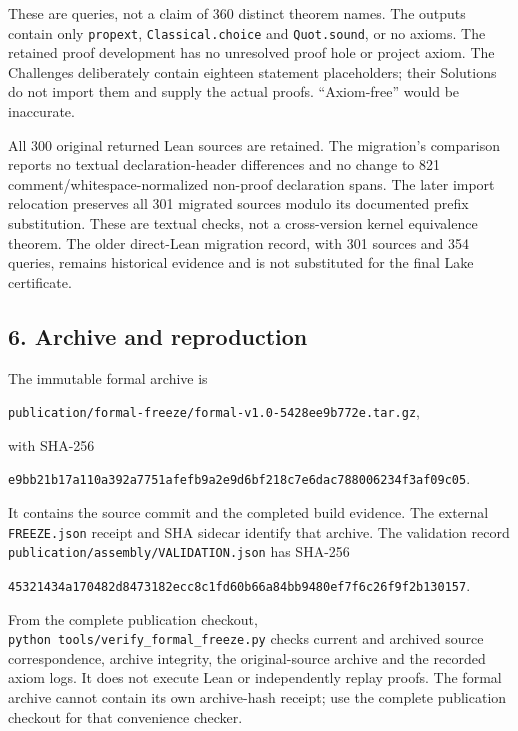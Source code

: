 \documentclass[english,11pt,a4paper]{article}
\begin{document}
These are queries, not a claim of 360 distinct theorem names. The outputs contain only \texttt{propext}, \texttt{Classical.\allowbreak{}choice} and \texttt{Quot.\allowbreak{}sound}, or no axioms. The retained proof development has no unresolved proof hole or project axiom. The Challenges deliberately contain eighteen statement placeholders; their Solutions do not import them and supply the actual proofs. ``Axiom-free'' would be inaccurate.

All 300 original returned Lean sources are retained. The migration's comparison reports no textual declaration-header differences and no change to 821 comment/whitespace-normalized non-proof declaration spans. The later import relocation preserves all 301 migrated sources modulo its documented prefix substitution. These are textual checks, not a cross-version kernel equivalence theorem. The older direct-Lean migration record, with 301 sources and 354 queries, remains historical evidence and is not substituted for the final Lake certificate.

\subsection{6. Archive and reproduction}\label{archive-and-reproduction}

The immutable formal archive is

\texttt{publication/\allowbreak{}formal-freeze/\allowbreak{}formal-v1.\allowbreak{}0-5428ee9b772e.\allowbreak{}tar.\allowbreak{}gz},

with SHA-256

\texttt{e9bb21b1\allowbreak{}7a110a39\allowbreak{}2a7751af\allowbreak{}efb9a2e9\allowbreak{}d6bf218c\allowbreak{}7e6dac78\allowbreak{}8006234f\allowbreak{}3af09c05}.

It contains the source commit and the completed build evidence. The external \texttt{FREEZE.\allowbreak{}json} receipt and SHA sidecar identify that archive. The validation record \texttt{publication/\allowbreak{}assembly/\allowbreak{}VALIDATION.\allowbreak{}json} has SHA-256

\texttt{45321434\allowbreak{}a170482d\allowbreak{}8473182e\allowbreak{}cc8c1fd6\allowbreak{}0b66a84b\allowbreak{}b9480ef7\allowbreak{}f6c26f9f\allowbreak{}2b130157}.

From the complete publication checkout, \texttt{python\ tools/\allowbreak{}verify\_\allowbreak{}formal\_\allowbreak{}freeze.\allowbreak{}py} checks current and archived source correspondence, archive integrity, the original-source archive and the recorded axiom logs. It does not execute Lean or independently replay proofs. The formal archive cannot contain its own archive-hash receipt; use the complete publication checkout for that convenience checker.
\end{document}
